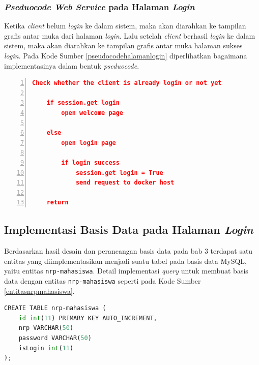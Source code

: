 \subsubsection{\textit{Pseduocode Web Service} pada Halaman \textit{Login}}
Ketika \textit{client} belum \textit{login} ke dalam sistem, maka akan diarahkan ke tampilan grafis antar muka dari halaman \textit{login}. Lalu setelah \textit{client} berhasil \textit{login} ke dalam sistem, maka akan diarahkan ke tampilan grafis antar muka halaman sukses \textit{login}. Pada Kode Sumber \ref{pseudocodehalamanlogin} diperlihatkan bagaimana implementasinya dalam bentuk \textit{pseduocode}.

\begin{minipage}{\linewidth}  
	\begin{lstlisting}[numbers=left, frame=single,tabsize=2,breaklines,caption={Pseudocode Web Service},label=pseudocodehalamanlogin,language=json]
	Check whether the client is already login or not yet
	
	if session.get login
		open welcome page
		
	else
		open login page
		
		if login success
			session.get login = True
			send request to docker host
	
	return  	
	\end{lstlisting}
\end{minipage}


\subsection{Implementasi Basis Data pada Halaman \textit{Login}}
Berdasarkan hasil desain dan perancangan basis data pada bab 3 terdapat satu entitas yang diimplementasikan menjadi suatu tabel pada basis data MySQL, yaitu entitas \texttt{nrp-mahasiswa}. Detail implementasi \textit{query} untuk membuat basis data dengan entitas \texttt{nrp-mahasiswa} seperti pada Kode Sumber \ref{entitasnrpmahasiswa}.\\
\begin{lstlisting}[frame=single,tabsize=2,breaklines,captionpos=b,language=python, caption=\textit{Query} untuk membuat tabel testing,label=entitasnrpmahasiswa]
CREATE TABLE nrp-mahasiswa (
	id int(11) PRIMARY KEY AUTO_INCREMENT,
	nrp VARCHAR(50)
	password VARCHAR(50)
	isLogin int(11)
);
\end{lstlisting}


